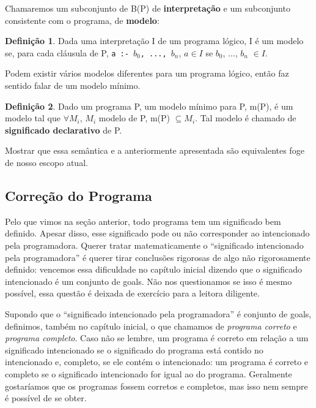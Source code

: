 \documentclass{article}
\theoremstyle{definition}
\newtheorem{definition}{Definição}[section]
\theoremstyle{remark}
\begin{document}
  Chamaremos um subconjunto de B(P) de \textbf{interpretação} e um subconjunto consistente com o programa, de \textbf{modelo}:

\begin{definition} Dada uma interpretação I de um programa lógico, I é um modelo se, para cada cláusula de P, {\tt a :- $b_0$, ..., $b_n$}, $a \in I$ se $b_0$, ..., $b_n$ $\in I$.
\end{definition}

 Podem existir vários modelos diferentes para um programa lógico, então faz sentido falar de um modelo mínimo.

\begin{definition} Dado um programa P, um modelo mínimo para P, m(P), é um modelo tal que $\forall M_i$, $M_i$ modelo de P, m(P) $\subseteq M_i$. Tal modelo é chamado de \textbf{significado declarativo} de P.
\end{definition}

Mostrar que essa semântica e a anteriormente apresentada são equivalentes foge de nosso escopo atual.

\subsection{Correção do Programa}

Pelo que vimos na seção anterior, todo programa tem um significado bem definido. Apesar disso, esse significado pode ou não corresponder ao intencionado pela programadora. Querer tratar matematicamente o ``significado intencionado pela programadora'' é querer tirar conclusões rigorosas de algo não rigorosamente definido: vencemos essa dificuldade no capítulo inicial dizendo que o significado intencionado é um conjunto de goals. Não nos questionamos se
isso é mesmo possível, essa questão é deixada de exercício para a leitora diligente.

Supondo que o ``significado intencionado pela programadora'' é conjunto de goals, definimos, também no capítulo inicial, o que chamamos de \textit{programa correto} e \textit{programa completo}. Caso não se lembre, um programa é correto em relação a um significado intencionado se o significado do programa está contido no intencionado e, completo, se ele contém o intencionado: um programa é correto e completo se o significado intencionado for igual ao do programa.
Geralmente gostaríamos que os programas fossem corretos e completos, mas isso nem sempre é possível de se obter.
\end{document}
